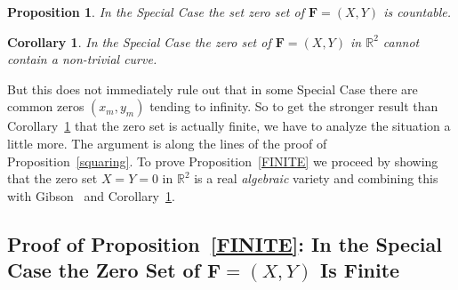 \documentclass{article}
\newtheorem{cor}[thm]{Corollary}
\newtheorem{prop}[thm]{Proposition}
\theoremstyle{remark}
\numberwithin{equation}{section}
\begin{document}
\begin{prop}\label{Tamas} In the Special Case the set zero set of ${\mathbf F}=(X,Y)$ is countable.
\end{prop}

\begin{cor}\label{XXXtoo} In the Special Case the zero set of ${\mathbf F}=(X,Y)$ in ${\mathbb R}^2$ cannot contain a non-trivial curve.
\end{cor}

But this does not immediately rule out that in some Special Case there are common zeros $(x_m,y_m)$ tending to infinity. So to get the stronger result than 
Corollary~\ref{XXXtoo} that the zero set is actually finite, we have to analyze the situation a little more. The argument is along the lines of the proof of 
Proposition~\ref{squaring}. To prove Proposition~\ref{FINITE} we proceed by showing that the zero set $X=Y=0$ in ${\mathbb R}^2$ is a real {\it algebraic} variety 
and combining this with Gibson~\cite{Gibson} and Corollary~\ref{XXXtoo}. 

\subsection{Proof of Proposition~\ref{FINITE}: In the Special Case the Zero Set of ${\mathbf F}=(X,Y)$ Is Finite}\label{subsec3.4}
\end{document}
